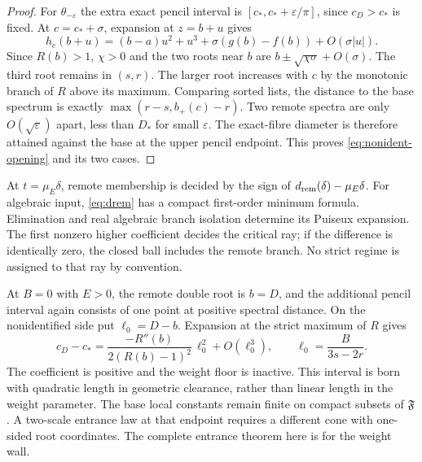 \begin{proof}
For $\theta_{-\varepsilon}$ the extra exact pencil interval is
$[c_*,c_*+\varepsilon/\pi]$, since $c_D>c_*$ is fixed. At
$c=c_*+\sigma$, expansion at $z=b+u$ gives
\[
 h_c(b+u)=(b-a)u^2+u^3+\sigma(g(b)-f(b))+O(\sigma|u|).
\]
Since $R(b)>1$, $\chi>0$ and the two roots near $b$ are
$b\pm\sqrt{\chi\sigma}+O(\sigma)$. The third root remains in $(s,r)$.
The larger root increases with $c$ by the monotonic branch of $R$ above
its maximum. Comparing sorted lists, the distance to the base spectrum
is exactly $\max(r-s,b_+(c)-r)$. Two remote spectra are only
$O(\sqrt\varepsilon)$ apart, less than $D_*$ for small $\varepsilon$.
The exact-fibre diameter is therefore attained against the base at the
upper pencil endpoint. This proves \eqref{eq:nonident-opening} and
its two cases.
\end{proof}

\begin{remark}
At $t=\mu_E\delta$, remote membership is decided by the sign of
$d_{\rm rem}(\delta)-\mu_E\delta$. For algebraic input,
\eqref{eq:drem} has a compact first-order minimum formula. Elimination
and real algebraic branch isolation determine its Puiseux expansion.
The first nonzero higher coefficient decides the critical ray; if the
difference is identically zero, the closed ball includes the remote
branch. No strict regime is assigned to that ray by convention.
\end{remark}

\begin{remark}
At $B=0$ with $E>0$, the remote double root is $b=D$, and the additional
pencil interval again consists of one point at positive spectral distance.
On the nonidentified side put $\ell_0=D-b$. Expansion at the strict
maximum of $R$ gives
\[
 c_D-c_*=
 \frac{-R''(b)}{2(R(b)-1)^2}\,\ell_0^2+O(\ell_0^3),\qquad
 \ell_0=\frac{B}{3s-2r}.
\]
The coefficient is positive and the weight floor is inactive. This
interval is born with quadratic length in geometric clearance, rather
than linear length in the weight parameter. The base local constants
remain finite on compact subsets of $\mathfrak F$. A two-scale entrance
law at that endpoint requires a different cone with one-sided root
coordinates. The complete entrance theorem here is for the weight wall.
\end{remark}

